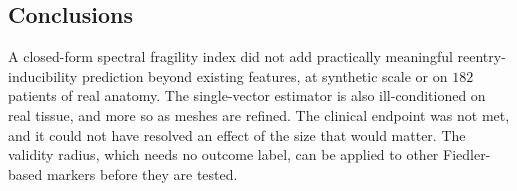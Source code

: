 \subsection*{Conclusions}

A closed-form spectral fragility index did not add practically meaningful
reentry-inducibility prediction beyond existing features, at synthetic scale or
on $182$ patients of real anatomy. The single-vector estimator is also
ill-conditioned on real tissue, and more so as meshes are refined. The clinical
endpoint was not met, and it could not have resolved an effect of the size that
would matter. The validity radius, which needs no outcome label, can be applied
to other Fiedler-based markers before they are tested.
